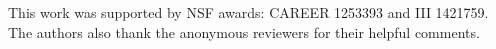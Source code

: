 
 This work was supported by NSF awards: CAREER 1253393
and III 1421759. The authors also thank the anonymous reviewers for their helpful comments.